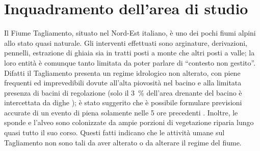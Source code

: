

\section{Inquadramento dell'area di studio}
Il Fiume Tagliamento, situato nel Nord-Est italiano, è uno dei pochi fiumi alpini allo stato quasi naturale. 
Gli interventi effettuati sono arginature, derivazioni, pennelli, estrazione di ghiaia sia in tratti posti a monte che altri posti a valle; la loro entità è comunque tanto limitata da poter parlare di “contesto non gestito”.
Difatti il Tagliamento presenta un regime idrologico non alterato, con piene frequenti ed imprevedibili dovute all'alta piovosità nel bacino  e alla limitata presenza di bacini di regolazione (solo il \SI{3}{\percent} dell'area drenante del bacino è intercettata da dighe );
è stato suggerito che è possibile formulare previsioni accurate di un evento di piena solamente nelle 5 ore precedenti .
Inoltre, le sponde e l'alveo sono colonizzate da ampie porzioni di vegetazione riparia lungo quasi tutto il suo corso. 
Questi fatti indicano che le attività umane sul Tagliamento non sono tali da aver alterato o da alterare il regime del fiume.


